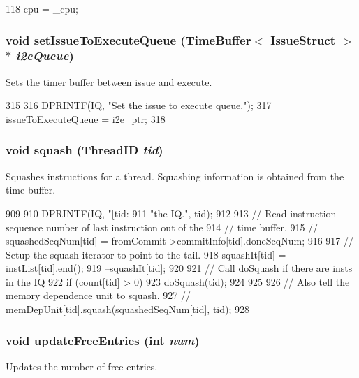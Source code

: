 \begin{DoxyCode}
118 { cpu = _cpu; }
\end{DoxyCode}
\hypertarget{classInstQueue_a7cbe625b8c47621898e7ca92d70c826b}{
\subsubsection[{setIssueToExecuteQueue}]{\setlength{\rightskip}{0pt plus 5cm}void setIssueToExecuteQueue ({\bf TimeBuffer}$<$ {\bf IssueStruct} $>$ $\ast$ {\em i2eQueue})}}
\label{classInstQueue_a7cbe625b8c47621898e7ca92d70c826b}
Sets the timer buffer between issue and execute. 


\begin{DoxyCode}
315 {
316     DPRINTF(IQ, "Set the issue to execute queue.\n");
317     issueToExecuteQueue = i2e_ptr;
318 }
\end{DoxyCode}
\hypertarget{classInstQueue_ad33d65c18c323d90695d7c2355b49af9}{
\subsubsection[{squash}]{\setlength{\rightskip}{0pt plus 5cm}void squash ({\bf ThreadID} {\em tid})}}
\label{classInstQueue_ad33d65c18c323d90695d7c2355b49af9}
Squashes instructions for a thread. Squashing information is obtained from the time buffer. 


\begin{DoxyCode}
909 {
910     DPRINTF(IQ, "[tid:%
911             "the IQ.\n", tid);
912 
913     // Read instruction sequence number of last instruction out of the
914     // time buffer.
915 //    squashedSeqNum[tid] = fromCommit->commitInfo[tid].doneSeqNum;
916 
917     // Setup the squash iterator to point to the tail.
918     squashIt[tid] = instList[tid].end();
919     --squashIt[tid];
920 
921     // Call doSquash if there are insts in the IQ
922     if (count[tid] > 0) {
923         doSquash(tid);
924     }
925 
926     // Also tell the memory dependence unit to squash.
927 //    memDepUnit[tid].squash(squashedSeqNum[tid], tid);
928 }
\end{DoxyCode}
\hypertarget{classInstQueue_a358bf0d85e8cd8b606877b341c518b5e}{
\subsubsection[{updateFreeEntries}]{\setlength{\rightskip}{0pt plus 5cm}void updateFreeEntries (int {\em num})}}
\label{classInstQueue_a358bf0d85e8cd8b606877b341c518b5e}
Updates the number of free entries. 



